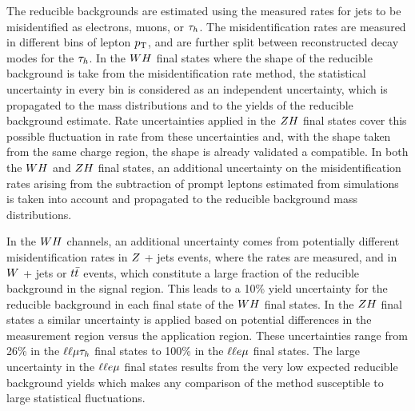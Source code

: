 The reducible backgrounds are estimated using the measured rates for jets to be 
misidentified as electrons, muons, or $\tau_{h}$. The misidentification rates are 
measured in different bins of lepton $p_\mathrm{T}$, and are further split between 
reconstructed decay modes for the $\tau_{h}$. In the $WH$ final states where
the shape of the reducible background is take from the misidentification rate
method, the statistical uncertainty in every 
bin is considered as an independent uncertainty, which is propagated to the mass 
distributions and to the yields of the reducible background estimate. Rate
uncertainties applied in the $ZH$ final states cover this possible fluctuation
in rate from these uncertainties and, with the shape taken from the same charge
region, the shape is already validated a compatible.
In both the $WH$ and $ZH$ final states, an additional
uncertainty on the misidentification rates arising from the subtraction of 
prompt leptons estimated from simulations is taken into account and propagated to 
the reducible background mass distributions. 

In the $WH$ channels, an 
additional uncertainty comes from potentially different misidentification rates 
in $Z$ + jets events, where the rates are measured, and in $W$ + jets or 
$t\bar{t}$ events, which constitute a large fraction of the reducible background 
in the signal region. This leads to a 10\% yield uncertainty for the reducible 
background in each final state of the $WH$ final states. In the $ZH$ final
states a similar uncertainty is applied based on potential differences in the
measurement region versus the application region. These uncertainties
range from 26\% in the $\ell\ell\mu\tau_{h}$ final states to 100\% in the
$\ell\ell e\mu$ final states. The large uncertainty in the $\ell\ell e\mu$ 
final states results from the very low expected reducible background yields 
which makes any comparison of the method susceptible to large statistical fluctuations.


